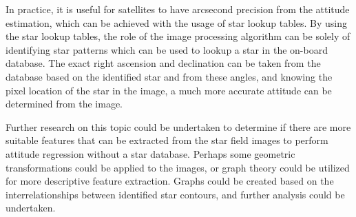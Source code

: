 \documentclass[10pt,twocolumn,letterpaper]{article}
\begin{document}
In practice, it is useful for satellites to have arcsecond precision from the attitude estimation, which can be achieved with the usage of star lookup tables. By using the star lookup tables, the role of the image processing algorithm can be solely of identifying star patterns which can be used to lookup a star in the on-board database. The exact right ascension and declination can be taken from the database based on the identified star and from these angles, and knowing the pixel location of the star in the image, a much more accurate attitude can be determined from the image.

Further research on this topic could be undertaken to determine if there are more suitable features that can be extracted from the star field images to perform attitude regression without a star database. Perhaps some geometric transformations could be applied to the images, or graph theory could be utilized for more descriptive feature extraction. Graphs could be created based on the interrelationships between identified star contours, and further analysis could be undertaken.


{\small


}
\end{document}
